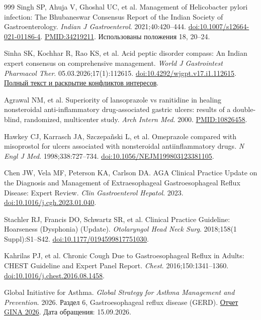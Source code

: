 \documentclass[11pt,a4paper,notitlepage]{report}
\begin{document}
\begin{thebibliography}{999}
 Singh SP, Ahuja V, Ghoshal UC, et al. Management of Helicobacter pylori infection: The Bhubaneswar Consensus Report of the Indian Society of Gastroenterology. \textit{Indian J Gastroenterol}. 2021;40:420--444. \href{https://doi.org/10.1007/s12664-021-01186-4}{doi:10.1007/s12664-021-01186-4}. \href{https://pubmed.ncbi.nlm.nih.gov/34219211/}{PMID:34219211}. Использованы положения 18, 20--24.

 Sinha SK, Kochhar R, Rao KS, et al. Acid peptic disorder compass: An Indian expert consensus on comprehensive management. \textit{World J Gastrointest Pharmacol Ther}. 05.03.2026;17(1):112615. \href{https://doi.org/10.4292/wjgpt.v17.i1.112615}{doi:10.4292/wjgpt.v17.i1.112615}. \href{https://www.wjgnet.com/2150-5349/full/v17/i1/112615.htm}{Полный текст и раскрытие конфликтов интересов}.


 Agrawal NM, et al. Superiority of lansoprazole vs ranitidine in healing nonsteroidal anti-inflammatory drug-associated gastric ulcers: results of a double-blind, randomized, multicenter study. \textit{Arch Intern Med}. 2000. \href{https://pubmed.ncbi.nlm.nih.gov/10826458/}{PMID:10826458}.

 Hawkey CJ, Karrasch JA, Szczepañski L, et al. Omeprazole compared with misoprostol for ulcers associated with nonsteroidal antiinflammatory drugs. \textit{N Engl J Med}. 1998;338:727--734. \href{https://doi.org/10.1056/NEJM199803123381105}{doi:10.1056/NEJM199803123381105}.

 Chen JW, Vela MF, Peterson KA, Carlson DA. AGA Clinical Practice Update on the Diagnosis and Management of Extraesophageal Gastroesophageal Reflux Disease: Expert Review. \textit{Clin Gastroenterol Hepatol}. 2023. \href{https://doi.org/10.1016/j.cgh.2023.01.040}{doi:10.1016/j.cgh.2023.01.040}.

 Stachler RJ, Francis DO, Schwartz SR, et al. Clinical Practice Guideline: Hoarseness (Dysphonia) (Update). \textit{Otolaryngol Head Neck Surg}. 2018;158(1 Suppl):S1--S42. \href{https://doi.org/10.1177/0194599817751030}{doi:10.1177/0194599817751030}.

 Kahrilas PJ, et al. Chronic Cough Due to Gastroesophageal Reflux in Adults: CHEST Guideline and Expert Panel Report. \textit{Chest}. 2016;150:1341--1360. \href{https://doi.org/10.1016/j.chest.2016.08.1458}{doi:10.1016/j.chest.2016.08.1458}.

 Global Initiative for Asthma. \textit{Global Strategy for Asthma Management and Prevention}. 2026. Раздел 6, Gastroesophageal reflux disease (GERD). \href{https://ginasthma.org/wp-content/uploads/2026/05/GINA-2026-Strategy-Report-WMS.pdf}{Отчет GINA 2026}. Дата обращения: 15.09.2026.


\end{thebibliography}
\end{document}
